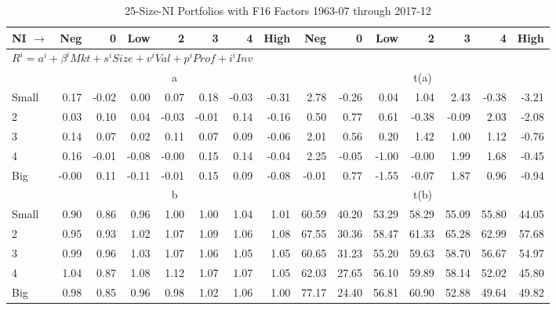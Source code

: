 
\begin{table}[!ht]
\scriptsize
\centering
\caption{25-Size-NI Portfolios with F16 Factors 1963-07 through 2017-12}
\begin{tabular}{lrrrrrrrrrrrrrr}
  \toprule
    
    NI $\rightarrow$ & Neg & 0 & Low & 2 & 3 & 4 & High & Neg & 0 & Low & 2 & 3 & 4 & High  \\ 
  \midrule
  \multicolumn{15}{l}{$R^i=a^i+\beta^iMkt+s^iSize+v^iVal+p^iProf+i^iInv$}  \\
  
     & \multicolumn{7}{c}{a} & \multicolumn{7}{c}{t(a)}   \\
     \cmidrule(r){2-8} \cmidrule(r){9-15} 
    Small  & 0.17  & -0.02  & 0.00  & 0.07  & 0.18  & -0.03  & -0.31  & 2.78  & -0.26  & 0.04  & 1.04  & 2.43  & -0.38  & -3.21   \\
    2  & 0.03  & 0.10  & 0.04  & -0.03  & -0.01  & 0.14  & -0.16  & 0.50  & 0.77  & 0.61  & -0.38  & -0.09  & 2.03  & -2.08   \\
    3  & 0.14  & 0.07  & 0.02  & 0.11  & 0.07  & 0.09  & -0.06  & 2.01  & 0.56  & 0.20  & 1.42  & 1.00  & 1.12  & -0.76   \\
    4  & 0.16  & -0.01  & -0.08  & -0.00  & 0.15  & 0.14  & -0.04  & 2.25  & -0.05  & -1.00  & -0.00  & 1.99  & 1.68  & -0.45   \\
    Big  & -0.00  & 0.11  & -0.11  & -0.01  & 0.15  & 0.09  & -0.08  & -0.01  & 0.77  & -1.55  & -0.07  & 1.87  & 0.96  & -0.94   \\
    
  
     & \multicolumn{7}{c}{b} & \multicolumn{7}{c}{t(b)}   \\
     \cmidrule(r){2-8} \cmidrule(r){9-15} 
    Small  & 0.90  & 0.86  & 0.96  & 1.00  & 1.00  & 1.04  & 1.01  & 60.59  & 40.20  & 53.29  & 58.29  & 55.09  & 55.80  & 44.05   \\
    2  & 0.95  & 0.93  & 1.02  & 1.07  & 1.09  & 1.06  & 1.08  & 67.55  & 30.36  & 58.47  & 61.33  & 65.28  & 62.99  & 57.68   \\
    3  & 0.99  & 0.96  & 1.03  & 1.07  & 1.06  & 1.05  & 1.05  & 60.65  & 31.23  & 55.20  & 59.63  & 58.70  & 56.67  & 54.97   \\
    4  & 1.04  & 0.87  & 1.08  & 1.12  & 1.07  & 1.07  & 1.05  & 62.03  & 27.65  & 56.10  & 59.89  & 58.14  & 52.02  & 45.80   \\
    Big  & 0.98  & 0.85  & 0.96  & 0.98  & 1.02  & 1.06  & 1.00  & 77.17  & 24.40  & 56.81  & 60.90  & 52.88  & 49.64  & 49.82   \\
    

\end{tabular}
\end{table}
